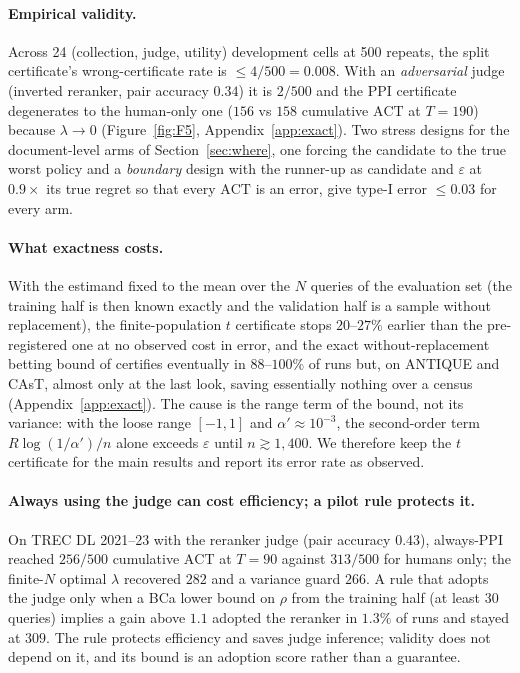 \documentclass{article}
\newcommand{\eps}{\varepsilon}
\newcommand{\ACT}{\mathrm{ACT}}
\begin{document}
\paragraph{Empirical validity.} Across 24 (collection, judge, utility) development cells at 500 repeats, the split certificate's wrong-certificate rate is $\le 4/500=0.008$. With an \emph{adversarial} judge (inverted reranker, pair accuracy $0.34$) it is $2/500$ and the PPI certificate degenerates to the human-only one ($156$ vs $158$ cumulative $\ACT$ at $T=190$) because $\lambda\to0$ (Figure~\ref{fig:F5}, Appendix~\ref{app:exact}). Two stress designs for the document-level arms of Section~\ref{sec:where}, one forcing the candidate to the true worst policy and a \emph{boundary} design with the runner-up as candidate and $\eps$ at $0.9\times$ its true regret so that every $\ACT$ is an error, give type-I error $\le0.03$ for every arm.

\paragraph{What exactness costs.} With the estimand fixed to the mean over the $N$ queries of the evaluation set (the training half is then known exactly and the validation half is a sample without replacement), the finite-population $t$ certificate stops $20$--$27\%$ earlier than the pre-registered one at no observed cost in error, and the exact without-replacement betting bound of \citet{waudby2020wor} certifies eventually in $88$--$100\%$ of runs but, on ANTIQUE and CAsT, almost only at the last look, saving essentially nothing over a census (Appendix~\ref{app:exact}). The cause is the range term of the bound, not its variance: with the loose range $[-1,1]$ and $\alpha'\approx10^{-3}$, the second-order term $R\log(1/\alpha')/n$ alone exceeds $\eps$ until $n\gtrsim1{,}400$. We therefore keep the $t$ certificate for the main results and report its error rate as observed.

\paragraph{Always using the judge can cost efficiency; a pilot rule protects it.} On TREC DL 2021--23 with the reranker judge (pair accuracy $0.43$), always-PPI reached $256/500$ cumulative $\ACT$ at $T=90$ against $313/500$ for humans only; the finite-$N$ optimal $\lambda$ recovered $282$ and a variance guard $266$. A rule that adopts the judge only when a BCa \citep{efron1987bca} lower bound on $\rho$ from the training half (at least 30 queries) implies a gain above $1.1$ adopted the reranker in $1.3\%$ of runs and stayed at $309$. The rule protects efficiency and saves judge inference; validity does not depend on it, and its bound is an adoption score rather than a guarantee.
\end{document}
